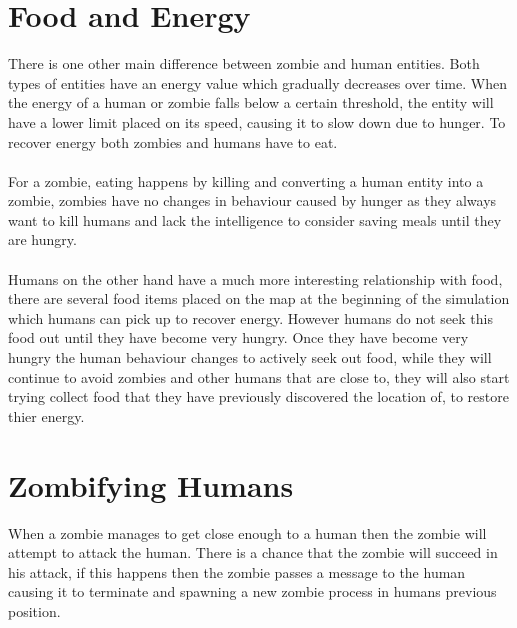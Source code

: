 \documentclass[10pt, a4paper, conference, compsocconf]{IEEEtran}
\begin{document}
\section{Food and Energy \label{food}}
There is one other main difference between zombie and human entities. Both types of entities have an energy value which gradually decreases over time. When the energy of a human or zombie falls below a certain threshold, the entity will have a lower limit placed on its speed, causing it to slow down due to hunger. To recover energy both zombies and humans have to eat.\\
\\
For a zombie, eating happens by killing and converting a human entity into a zombie, zombies have no changes in behaviour caused by hunger as they always want to kill humans and lack the intelligence to consider saving meals until they are hungry.\\
\\
Humans on the other hand have a much more interesting relationship with food, there are several food items placed on the map at the beginning of the simulation which humans can pick up to recover energy. However humans do not seek this food out until they have become very hungry. Once they have become very hungry the human behaviour changes to actively seek out food, while they will continue to avoid zombies and other humans that are close to, they will also start trying collect food that they have previously discovered the location of, to restore thier energy.\\

\section{Zombifying Humans \label{zombifying}}
When a zombie manages to get close enough to a human then the zombie will attempt to attack the human. There is a chance that the zombie will succeed in his attack, if this happens then the zombie passes a message to the human causing it to terminate and spawning a new zombie process in humans previous position.\\
\end{document}
